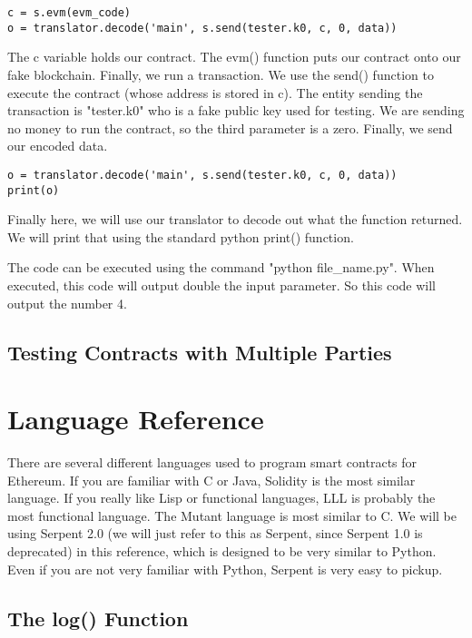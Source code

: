 \documentclass[12pt]{article}
\begin{document}
\begin{lstlisting}
c = s.evm(evm_code)
o = translator.decode('main', s.send(tester.k0, c, 0, data))
\end{lstlisting}

The c variable holds our contract. The evm() function puts our contract onto our fake blockchain. Finally, we run a transaction. We use the send() function to execute the contract (whose address is stored in c). The entity sending the transaction is "tester.k0" who is a fake public key used for testing. We are sending no money to run the contract, so the third parameter is a zero. Finally, we send our encoded data.

\begin{lstlisting}
o = translator.decode('main', s.send(tester.k0, c, 0, data))
print(o)
\end{lstlisting}

Finally here, we will use our translator to decode out what the function returned. We will print that using the standard python print() function.

The code can be executed using the command "python file\_name.py". When executed, this code will output double the input parameter. So this code will output the number 4.

\subsection{Testing Contracts with Multiple Parties}

\section{Language Reference}

There are several different languages used to program smart contracts for Ethereum. If you are familiar with C or Java, Solidity is the most similar language. If you really like Lisp or functional languages, LLL is probably the most functional language. The Mutant language is most similar to C. We will be using Serpent 2.0 (we will just refer to this as Serpent, since Serpent 1.0 is deprecated) in this reference, which is designed to be very similar to Python. Even if you are not very familiar with Python, Serpent is very easy to pickup. 

\subsection{The log() Function}
\end{document}
